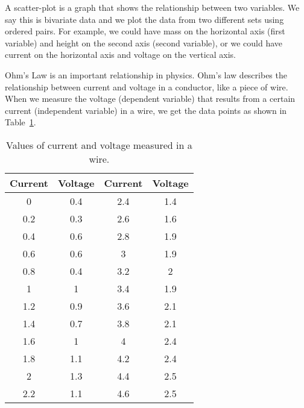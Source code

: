 
A scatter-plot is a graph that shows the relationship between two variables. We say this is bivariate data and we plot the data from two different sets using ordered pairs. For example, we could have mass on the horizontal axis (first variable) and height on the second axis (second variable), or we could have current on the horizontal axis and voltage on the vertical axis.

Ohm's Law is an important relationship in physics. Ohm's law describes the relationship between current and voltage in a conductor, like a piece of wire. When we measure the voltage (dependent variable) that results from a certain current (independent variable) in a wire, we get the data points as shown in Table~\ref{tab:ms:sp:ohm}.

\begin{table}[!ht]
\begin{center}
\caption{Values of current and voltage measured in a wire.}
\begin{tabular}{|c|c||c|c|}\hline
\textbf{Current} & \textbf{Voltage} & \textbf{Current} & \textbf{Voltage} \\\hline\hline
0 & 0.4 & 2.4 & 1.4 \\\hline
0.2 & 0.3 & 2.6 & 1.6 \\\hline
0.4 & 0.6 & 2.8 & 1.9 \\\hline
0.6 & 0.6 & 3 & 1.9 \\\hline
0.8 & 0.4 & 3.2 & 2 \\\hline
1 & 1 & 3.4 & 1.9 \\\hline
1.2 & 0.9 & 3.6 & 2.1 \\\hline
1.4 & 0.7 & 3.8 & 2.1 \\\hline
1.6 & 1 & 4 & 2.4 \\\hline
1.8 & 1.1 & 4.2 & 2.4 \\\hline
2 & 1.3 & 4.4 & 2.5 \\\hline
2.2 & 1.1 & 4.6 & 2.5 \\\hline
\end{tabular}
\label{tab:ms:sp:ohm}
\end{center}
\end{table}

